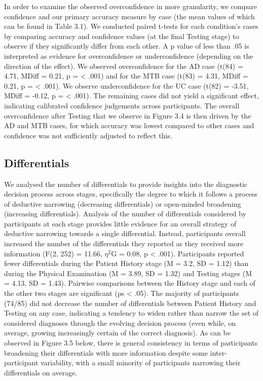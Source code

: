 \documentclass[a4paper, nobind]{templates/ociamthesis}
\begin{document}
In order to examine the observed overconfidence in more granularity, we compare confidence and our primary accuracy measure by case (the mean values of which can be found in Table 3.1). We conducted paired t-tests for each condition's cases by comparing accuracy and confidence values (at the final Testing stage) to observe if they significantly differ from each other. A p value of less than .05 is interpreted as evidence for overconfidence or underconfidence (depending on the direction of the effect). We observed overconfidence for the AD case (t(84) = 4.71, MDiff = 0.21, p = \textless{} .001) and for the MTB case (t(83) = 4.31, MDiff = 0.21, p = \textless{} .001). We observe underconfidence for the UC case (t(82) = -3.51, MDiff = -0.12, p = \textless{} .001). The remaining cases did not yield a significant effect, indicating calibrated confidence judgements across participants. The overall overconfidence after Testing that we observe in Figure 3.4 is then driven by the AD and MTB cases, for which accuracy was lowest compared to other cases and confidence was not sufficiently adjusted to reflect this.

\subsection*{Differentials}\label{differentials}

We analysed the number of differentials to provide insights into the diagnostic decision process across stages, specifically the degree to which it follows a process of deductive narrowing (decreasing differentials) or open-minded broadening (increasing differentials). Analysis of the number of differentials considered by participants at each stage provides little evidence for an overall strategy of deductive narrowing towards a single differential. Instead, participants overall increased the number of the differentials they reported as they received more information (F(2, 252) = 11.66, \(\eta^2\)G = 0.08, p \textless{} .001). Participants reported fewer differentials during the Patient History stage (M = 3.2, SD = 1.12) than during the Physical Examination (M = 3.89, SD = 1.32) and Testing stages (M = 4.13, SD = 1.43). Pairwise comparisons between the History stage and each of the other two stages are significant (ps \textless{} .05). The majority of participants (74/85) did not decrease the number of differentials between Patient History and Testing on any case, indicating a tendency to widen rather than narrow the set of considered diagnoses through the evolving decision process (even while, on average, growing increasingly certain of the correct diagnosis). As can be observed in Figure 3.5 below, there is general consistency in terms of participants broadening their differentials with more information despite some inter-participant variability, with a small minority of participants narrowing their differentials on average.
\end{document}

